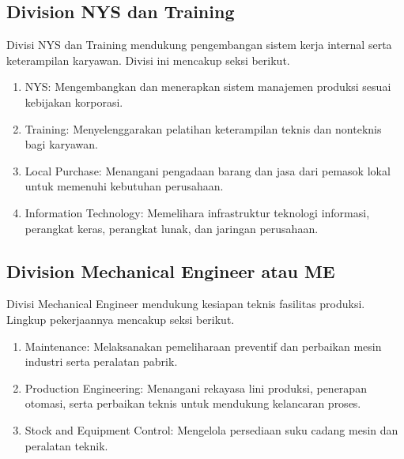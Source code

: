 \subsection{Division NYS dan Training}

Divisi NYS dan Training mendukung pengembangan sistem kerja internal serta keterampilan karyawan. Divisi ini mencakup seksi berikut.

\begin{enumerate}[leftmargin=*,itemsep=2pt]
\item NYS: Mengembangkan dan menerapkan sistem manajemen produksi sesuai kebijakan korporasi.

\item Training: Menyelenggarakan pelatihan keterampilan teknis dan nonteknis bagi karyawan.

\item Local Purchase: Menangani pengadaan barang dan jasa dari pemasok lokal untuk memenuhi kebutuhan perusahaan.

\item Information Technology: Memelihara infrastruktur teknologi informasi, perangkat keras, perangkat lunak, dan jaringan perusahaan.

\end{enumerate}

\subsection{Division Mechanical Engineer atau ME}

Divisi Mechanical Engineer mendukung kesiapan teknis fasilitas produksi. Lingkup pekerjaannya mencakup seksi berikut.

\begin{enumerate}[leftmargin=*,itemsep=2pt]
\item Maintenance: Melaksanakan pemeliharaan preventif dan perbaikan mesin industri serta peralatan pabrik.

\item Production Engineering: Menangani rekayasa lini produksi, penerapan otomasi, serta perbaikan teknis untuk mendukung kelancaran proses.

\item Stock and Equipment Control: Mengelola persediaan suku cadang mesin dan peralatan teknik.

\end{enumerate}

